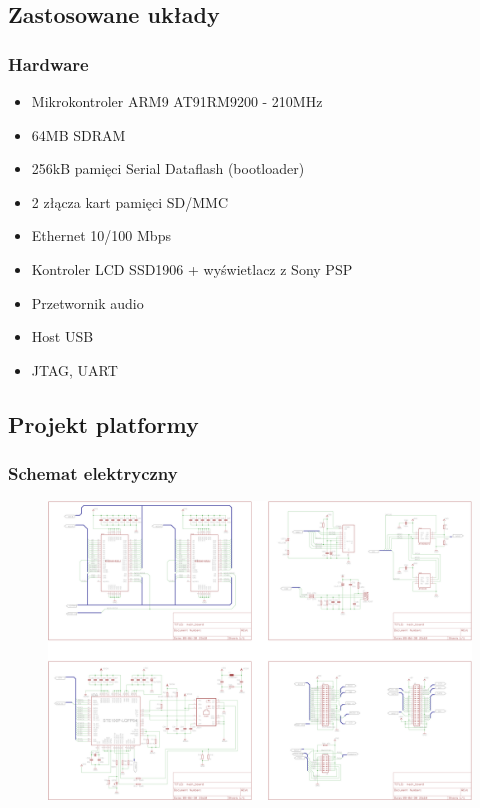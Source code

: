 \documentclass[xcolor=dvipsnames]{beamer}
\newenvironment{ramka}{\begin{frame}}
{
		\end{frame}
}
\begin{document}
	\subsection{Zastosowane układy}
	\begin{ramka}
		\frametitle{Hardware}
		\begin{itemize}
			\item<1-> Mikrokontroler ARM9 AT91RM9200 - 210MHz
			\item<1-> 64MB SDRAM
			\item<1-> 256kB pamięci Serial Dataflash (bootloader)
			\item<1-> 2 złącza kart pamięci SD/MMC
			\item<1-> Ethernet 10/100 Mbps
			\item<1-> Kontroler LCD SSD1906 + wyświetlacz z Sony PSP
			\item<1-> Przetwornik audio
			\item<1-> Host USB
			\item<1-> JTAG, UART
		\end{itemize}
	\end{ramka} 
	
	\subsection{Projekt platformy}
	\begin{ramka}
		\frametitle{Schemat elektryczny}
		\begin{figure}[h]
			\includegraphics[scale=0.4]{text/img/main_sch.png} 
		\end{figure}
	\end{ramka}
	
\end{document}
